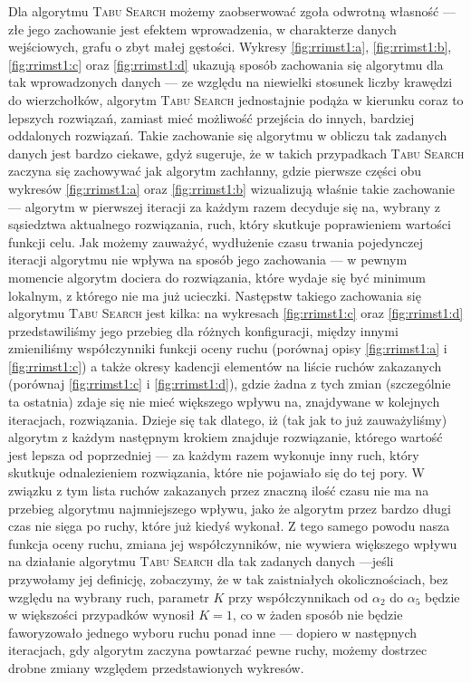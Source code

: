 Dla algorytmu \textsc{Tabu Search} możemy zaobserwować zgoła odwrotną własność --- złe jego zachowanie jest efektem wprowadzenia, w charakterze danych wejściowych, grafu o zbyt małej gęstości. Wykresy \ref{fig:rrimst1:a}, \ref{fig:rrimst1:b}, \ref{fig:rrimst1:c} oraz \ref{fig:rrimst1:d} ukazują sposób zachowania się algorytmu dla tak wprowadzonych danych --- ze względu na niewielki stosunek liczby krawędzi do wierzchołków, algorytm \textsc{Tabu Search} jednostajnie podąża w kierunku coraz to lepszych rozwiązań, zamiast mieć możliwość przejścia do innych, bardziej oddalonych rozwiązań. Takie zachowanie się algorytmu w obliczu tak zadanych danych jest bardzo ciekawe, gdyż sugeruje, że w takich przypadkach \textsc{Tabu Search} zaczyna się zachowywać jak algorytm zachłanny, gdzie pierwsze części obu wykresów \ref{fig:rrimst1:a} oraz \ref{fig:rrimst1:b} wizualizują właśnie takie zachowanie --- algorytm w pierwszej iteracji za każdym razem decyduje się na, wybrany z sąsiedztwa aktualnego rozwiązania, ruch, który skutkuje poprawieniem wartości funkcji celu. Jak możemy zauważyć, wydłużenie czasu trwania pojedynczej iteracji algorytmu nie wpływa na sposób jego zachowania --- w pewnym momencie algorytm dociera do rozwiązania, które wydaje się być minimum lokalnym, z którego nie ma już ucieczki. Następstw takiego zachowania się algorytmu \textsc{Tabu Search} jest kilka: na wykresach \ref{fig:rrimst1:c} oraz \ref{fig:rrimst1:d} przedstawiliśmy jego przebieg dla różnych konfiguracji, między innymi zmieniliśmy współczynniki funkcji oceny ruchu (porównaj opisy \ref{fig:rrimst1:a} i \ref{fig:rrimst1:c}) a także okresy kadencji elementów na liście ruchów zakazanych (porównaj \ref{fig:rrimst1:c} i \ref{fig:rrimst1:d}), gdzie żadna z tych zmian (szczególnie ta ostatnia) zdaje się nie mieć większego wpływu na, znajdywane w kolejnych iteracjach, rozwiązania. Dzieje się tak dlatego, iż (tak jak to już zauważyliśmy) algorytm z każdym następnym krokiem znajduje rozwiązanie, którego wartość jest lepsza od poprzedniej --- za każdym razem wykonuje inny ruch, który skutkuje odnalezieniem rozwiązania, które nie pojawiało się do tej pory. W związku z tym lista ruchów zakazanych przez znaczną ilość czasu nie ma na przebieg algorytmu najmniejszego wpływu, jako że algorytm przez bardzo długi czas nie sięga po ruchy, które już kiedyś wykonał. Z tego samego powodu nasza funkcja oceny ruchu, zmiana jej współczynników, nie wywiera większego wpływu na działanie algorytmu \textsc{Tabu Search} dla tak zadanych danych ---jeśli przywołamy jej definicję, zobaczymy, że w tak zaistniałych okolicznościach, bez względu na wybrany ruch, parametr $K$ przy współczynnikach od $\alpha_{2}$ do $\alpha_{5}$ będzie w większości przypadków wynosił $K = 1$, co w żaden sposób nie będzie faworyzowało jednego wyboru ruchu ponad inne --- dopiero w następnych iteracjach, gdy algorytm zaczyna powtarzać pewne ruchy, możemy dostrzec drobne zmiany względem przedstawionych wykresów.

